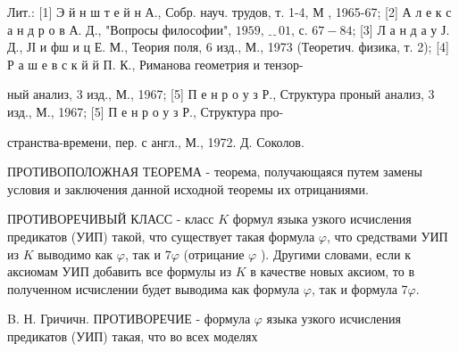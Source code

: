 \documentclass[10pt]{article}
\begin{document}
Лит.: [1] Э й н ш т е й н А., Собр. науч. трудов, т. 1-4, М , 1965-67; [2] А л е к с а н д р о в А. Д., "Вопросы философии", $1959, ﹎{0} 1$, с. $67-84$; [3] Л а н д а у Ј. Д., ЈІ и фш и ц Е. М., Теория поля, 6 изд., М., 1973 (Теоретич. физика, т. 2); [4] Р а ш е в с к й й П. К., Риманова геометрия и тензор-

ный анализ, 3 изд., М., 1967; [5] П е н р о у з Р., Структура проный анализ, 3 изд., М., 1967; [5] П е н р о у з Р., Структура про-

странства-времени, пер. с англ., М., 1972. Д. Соколов.



ПРОТИВОПОЛОЖНАЯ ТЕОРЕМА - теорема, получающаяся путем замены условия и заключения данной исходной теоремы их отрицаниями.



ПРОТИВОРЕЧИВЫЙ КЛАСС - класс $K$ формул языка узкого исчисления предикатов (УИП) такой, что существует такая формула $\varphi$, что средствами УИП из $K$ выводимо как $\varphi$, так и $7 \varphi$ (отрицание $\varphi$ ). Другими словами, если к аксиомам УИП добавить все формулы из $K$ в качестве новых аксиом, то в полученном исчислении будет выводима как формула $\varphi$, так и формула $7 \varphi$.



B. Н. Гричичн. ПРОТИВОРЕЧИЕ - формула $\varphi$ языка узкого исчисления предикатов (УИП) такая, что во всех моделях
\end{document}

